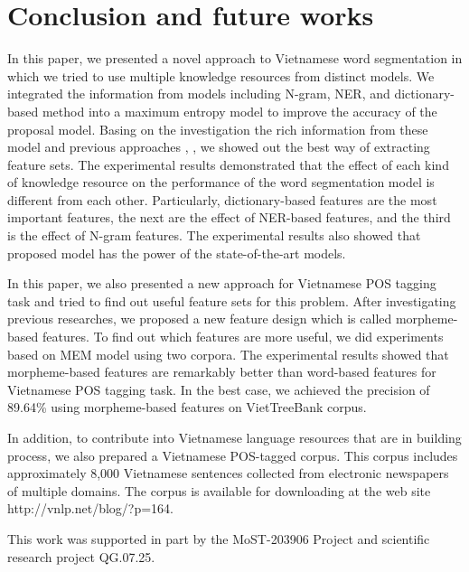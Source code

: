 \documentclass[english]{jnlp_1.4}
\begin{document}
\section{Conclusion and future works}

 In this paper, we presented a novel approach to Vietnamese word
segmentation in which we tried to use multiple knowledge resources
from distinct models. We integrated the information from models
including N-gram, NER, and dictionary-based method into a maximum
entropy model to improve the accuracy of the proposal model.
Basing on the investigation the rich information from these model and previous approaches \cite{CamTu07}, \cite{Dien06},
we showed out the best way of extracting feature sets.
The experimental results demonstrated that the effect of each kind of knowledge resource on the performance of the
word segmentation model is different from each other. Particularly, dictionary-based features are the most important features,
the next are the effect of NER-based features, and the third is the effect of N-gram features.
The experimental results also showed that proposed model has the power of the
state-of-the-art models.

In this paper, we also presented a new approach for Vietnamese POS tagging task
and tried to find out useful feature sets for this problem. After investigating previous researches, we proposed a new feature design which is called morpheme-based features.
To find out which features are more useful, we did experiments based on MEM model using two corpora.
The experimental results showed that morpheme-based features are remarkably
better than word-based features for Vietnamese POS tagging task. In the best case, we achieved the precision of 89.64\% using morpheme-based features on VietTreeBank corpus.

	In addition, to contribute into Vietnamese language resources that are in building process, we also prepared a Vietnamese POS-tagged corpus. This corpus includes approximately 8,000 Vietnamese sentences collected from electronic newspapers of multiple domains. The corpus is available for
downloading at the web site http://vnlp.net/blog/?p=164.



\acknowledgment

This work was supported in part by the MoST-203906 Project
and scientific research project QG.07.25.
\end{document}
